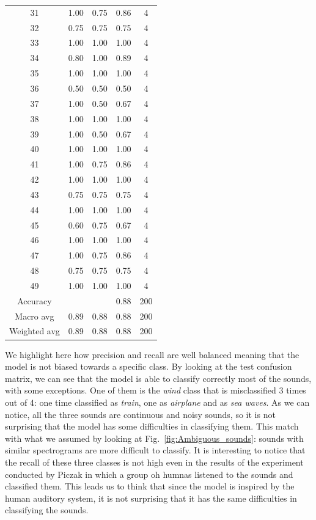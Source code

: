 \documentclass{article}
\begin{document}
\begin{sloppy}
\begin{table}[ht]
\begin{tabular}{|c|c|c|c|c|}
  31 & 1.00 & 0.75 & 0.86 & 4 \\
  32 & 0.75 & 0.75 & 0.75 & 4 \\
  33 & 1.00 & 1.00 & 1.00 & 4 \\
  34 & 0.80 & 1.00 & 0.89 & 4 \\
  35 & 1.00 & 1.00 & 1.00 & 4 \\
  36 & 0.50 & 0.50 & 0.50 & 4 \\
  37 & 1.00 & 0.50 & 0.67 & 4 \\
  38 & 1.00 & 1.00 & 1.00 & 4 \\
  39 & 1.00 & 0.50 & 0.67 & 4 \\
  40 & 1.00 & 1.00 & 1.00 & 4 \\
  41 & 1.00 & 0.75 & 0.86 & 4 \\
  42 & 1.00 & 1.00 & 1.00 & 4 \\
  43 & 0.75 & 0.75 & 0.75 & 4 \\
  44 & 1.00 & 1.00 & 1.00 & 4 \\
  45 & 0.60 & 0.75 & 0.67 & 4 \\
  46 & 1.00 & 1.00 & 1.00 & 4 \\
  47 & 1.00 & 0.75 & 0.86 & 4 \\
  48 & 0.75 & 0.75 & 0.75 & 4 \\
  49 & 1.00 & 1.00 & 1.00 & 4 \\
  \hline
  Accuracy & & & 0.88 & 200 \\
  Macro avg & 0.89 & 0.88 & 0.88 & 200 \\
  Weighted avg & 0.89 & 0.88 & 0.88 & 200 \\
  \hline
  \end{tabular}
\end{table}

We highlight here how precision and recall are well balanced meaning that the model is not biased towards a specific class.
\newline
By looking at the test confusion matrix, we can see that the model is able to classify correctly most of the sounds, with some exceptions.
One of them is the \textit{wind} class that is misclassified 3 times out of 4: one time classified as
\textit{train}, one as \textit{airplane} and as \textit{sea waves}. As we can notice, all the three sounds
are continuous and noisy sounds, so it is not surprising that the model has some difficulties in classifying them.
This match with what we assumed by looking at Fig.~\ref{fig:Ambiguous_sounds}: sounds with similar spectrograms are
more difficult to classify. It is interesting to notice that the recall of these three classes is not high even in the 
results of the experiment conducted by Piczak \cite{piczak2015dataset} in which a group oh humnas listened to the sounds and classified them.
This leads us to think that since the model is inspired by the human auditory system, it is not surprising that it has the same difficulties in classifying the sounds. 


\end{sloppy}
\end{document}
